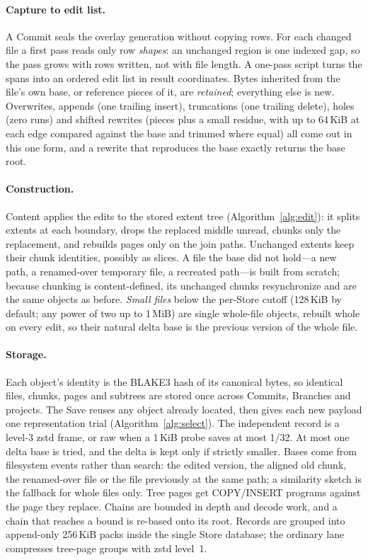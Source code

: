 \paragraph{Capture to edit list.} A Commit seals the overlay generation without copying
rows. For each changed file a first pass reads only row \emph{shapes}: an unchanged
region is one indexed gap, so the pass grows with rows written, not with file length. A
one-pass script turns the spans into an ordered edit list in result coordinates. Bytes
inherited from the file's own base, or reference pieces of it, are \emph{retained};
everything else is new. Overwrites, appends (one trailing insert), truncations (one
trailing delete), holes (zero runs) and shifted rewrites (pieces plus a small residue,
with up to 64\,KiB at each edge compared against the base and trimmed where equal) all
come out in this one form, and a rewrite that reproduces the base exactly returns the
base root.

\paragraph{Construction.} Content applies the edits to the stored extent tree
(Algorithm~\ref{alg:edit}): it splits extents at each boundary, drops the replaced
middle unread, chunks only the replacement, and rebuilds pages only on the join paths.
Unchanged extents keep their chunk identities, possibly as slices. A file the base did
not hold---a new path, a renamed-over temporary file, a recreated path---is built from
scratch; because chunking is content-defined, its unchanged chunks resynchronize and are
the same objects as before. \emph{Small files} below the per-Store cutoff (128\,KiB by
default; any power of two up to 1\,MiB) are single whole-file objects, rebuilt whole on
every edit, so their natural delta base is the previous version of the whole file.

\paragraph{Storage.} Each object's identity is the BLAKE3 hash of its canonical bytes,
so identical files, chunks, pages and subtrees are stored once across Commits, Branches
and projects. The Save reuses any object already located, then gives each new payload
one representation trial (Algorithm~\ref{alg:select}). The independent record is a
level-3 zstd frame, or raw when a 1\,KiB probe saves at most 1/32. At most one delta base
is tried, and the delta is kept only if strictly smaller. Bases come from filesystem
events rather than search: the edited version, the aligned old chunk, the renamed-over
file or the file previously at the same path; a similarity sketch is the fallback for
whole files only. Tree pages get COPY/INSERT programs against the page they replace.
Chains are bounded in depth and decode work, and a chain that reaches a bound is
re-based onto its root. Records are grouped into append-only 256\,KiB packs inside the
single Store database; the ordinary lane compresses tree-page groups with zstd level~1.

